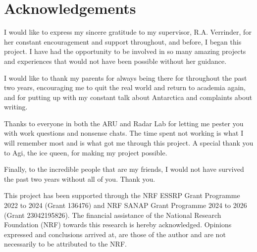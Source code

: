 \chapter{Acknowledgements}		
\label{ch:ack}

I would like to express my sincere gratitude to my supervisor, R.A. Verrinder, for her constant encouragement and support throughout, and before, I began this project. I have had the opportunity to be involved in so many amazing projects and experiences that would not have been possible without her guidance.

I would like to thank my parents for always being there for throughout the past two years, encouraging me to quit the real world and return to academia again, and for putting up with my constant talk about Antarctica and complaints about writing.

Thanks to everyone in both the ARU and Radar Lab for letting me pester you with work questions and nonsense chats. The time spent not working is what I will remember most and is what got me through this project. A special thank you to Agi, the ice queen, for making my project possible.

Finally, to the incredible people that are my friends, I would not have survived the past two years without all of you. Thank you.

This project has been supported through the NRF ESSRP Grant Programme 2022 to 2024 (Grant 136476) and NRF SANAP Grant Programme 2024 to 2026 (Grant 23042195826). The financial assistance of the National Research Foundation (NRF) towards this research is hereby acknowledged. Opinions expressed and conclusions arrived at, are those of the author and are not necessarily to be attributed to the NRF. 


